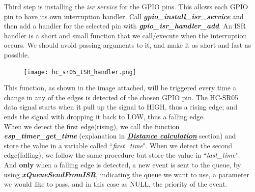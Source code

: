 \documentclass[14pt]{article}
\begin{document}
\begin{normalsize}
		\noindent Third step is installing the \textit{isr service} for the GPIO pins. This allows each GPIO pin to have its own interruption handler. Call \textit{\textbf{gpio\_install\_isr\_service}} and then add a handler for the selected pin with \textit{\textbf{gpio\_isr\_handler\_add}}. An ISR handler is a short and small function that we call/execute when the interruption occurs. We should avoid passing arguments to it, and make it as short and fast as possible.\vspace{-8pt}\\
		
		\begin{figure}
			\texttt{[image: hc\_sr05\_ISR\_handler.png]}
		\end{figure}
		\noindent This function, as shown in the image attached, will be triggered every time a change in any of the edges is detected of the chosen GPIO pin. The HC-SR05 data signal starts when it pull up the signal to HIGH, thus a rising edge; and ends the signal with dropping it back to LOW, thus a falling edge.\\
		When we detect the first edge(rising), we call the function \textbf{\textit{esp\_timer\_get\_time}} (explanation in \hyperref[dist_calc]{\textit{\textbf{Distance calculation}}} section) and store the value in a variable called ``\textit{first\_time}". When we detect the second edge(falling), we follow the same procedure but store the value in ``\textit{last\_time}".
		And \textbf{only} when a falling edge is detected, a new event is sent to the queue, by using \href{https://www.freertos.org/Documentation/02-Kernel/04-API-references/06-Queues/04-xQueueSendFromISR}{\textit{\textbf{xQueueSendFromISR}}}, indicating the queue we want to use, a parameter we would like to pass, and in this case as NULL, the priority of the event.\\
		

\end{normalsize}
\end{document}
